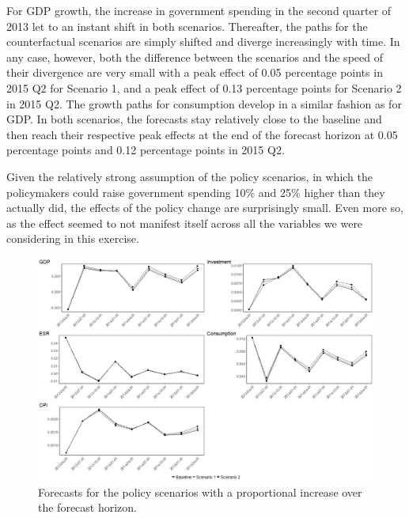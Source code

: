 For GDP growth, the increase in government spending in the second quarter of 2013 let to an instant shift in both scenarios. Thereafter, the paths for the counterfactual scenarios are simply shifted and diverge increasingly with time. In any case, however, both the difference between the scenarios and the speed of their divergence are very small with a peak effect of 0.05 percentage points in 2015 Q2 for Scenario 1, and a peak effect of 0.13 percentage points for Scenario 2 in 2015 Q2. The growth paths for consumption develop in a similar fashion as for GDP. In both scenarios, the forecasts stay relatively close to the baseline and then reach their respective peak effects at the end of the forecast horizon at 0.05 percentage points and 0.12 percentage points in 2015 Q2.

Given the relatively strong assumption of the policy scenarios, in which the policymakers could raise government spending 10\% and 25\% higher than they actually did, the effects of the policy change are surprisingly small. Even more so, as the effect seemed to not manifest itself across all the variables we were considering in this exercise.

\begin{figure}[!htbp]
	\centering
	\includegraphics[width=1\textwidth,height=1\textheight,keepaspectratio]{scenariofcst.png}
	\caption{Forecasts for the policy scenarios with a proportional increase over the forecast horizon.}
	\label{fig:results_dvar}
\end{figure} 

